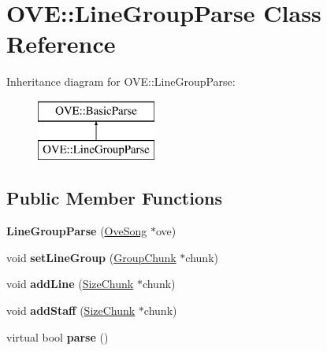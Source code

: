 \hypertarget{class_o_v_e_1_1_line_group_parse}{}\section{O\+VE\+:\+:Line\+Group\+Parse Class Reference}
\label{class_o_v_e_1_1_line_group_parse}
Inheritance diagram for O\+VE\+:\+:Line\+Group\+Parse\+:\begin{figure}[H]
\begin{center}
\leavevmode
\includegraphics[height=2.000000cm]{class_o_v_e_1_1_line_group_parse}
\end{center}
\end{figure}
\subsection*{Public Member Functions}
\begin{DoxyCompactItemize}
\item 
\mbox{\label{class_o_v_e_1_1_line_group_parse_ab9606e6561b2065f43b25b0dbd8c2dd8}} 
{\bfseries Line\+Group\+Parse} (\hyperlink{class_o_v_e_1_1_ove_song}{Ove\+Song} $\ast$ove)
\item 
\mbox{\label{class_o_v_e_1_1_line_group_parse_a4e384c3f4e34854ac8168bcbefa9effd}} 
void {\bfseries set\+Line\+Group} (\hyperlink{class_o_v_e_1_1_group_chunk}{Group\+Chunk} $\ast$chunk)
\item 
\mbox{\label{class_o_v_e_1_1_line_group_parse_a15755997c6b6664ae4e86a743eb30c0d}} 
void {\bfseries add\+Line} (\hyperlink{class_o_v_e_1_1_size_chunk}{Size\+Chunk} $\ast$chunk)
\item 
\mbox{\label{class_o_v_e_1_1_line_group_parse_af1bd5b099c7b77fba3dd56bee5af99a4}} 
void {\bfseries add\+Staff} (\hyperlink{class_o_v_e_1_1_size_chunk}{Size\+Chunk} $\ast$chunk)
\item 
\mbox{\label{class_o_v_e_1_1_line_group_parse_a083d6b13d830407ea1e5bab2d61081c0}} 
virtual bool {\bfseries parse} ()
\end{DoxyCompactItemize}
